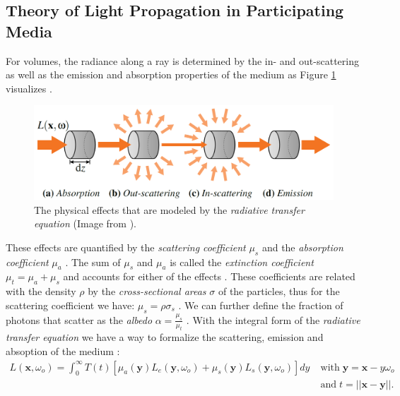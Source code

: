 \subsection{Theory of Light Propagation in Participating Media}
\label{subsec:theory_of_light_propagation_in_participating_media}
For volumes, the radiance along a ray is determined by the in- and out-scattering as well as the emission and absorption properties of the medium as Figure \ref{fig:novak_volume_effects} visualizes \cite{novak_overview}.
\begin{figure}[ht]
    \centering
    \includegraphics[width=0.7\linewidth]{img/novak_volume_effects.png}
    \caption[Physical effects in a volume]{The physical effects that are modeled by the \textit{radiative transfer equation} (Image from \cite{novak_overview}).}
    \label{fig:novak_volume_effects}
\end{figure}
These effects are quantified by the \textit{scattering coefficient} $\mu_s$ and the \textit{absorption coefficient} $\mu_a$ \cite{novak_overview}.
The sum of $\mu_s$ and $\mu_a$ is called the \textit{extinction coefficient} $\mu_t=\mu_a + \mu_s$ and accounts for either of the effects \cite{novak_overview}.
These coefficients are related with the density $\rho$ by the \textit{cross-sectional areas} $\sigma$ of the particles, thus for the scattering coefficient we have: $\mu_s = \rho \sigma_s$ \cite{novak_overview}.
We can further define the fraction of photons that scatter as the \textit{albedo} $\alpha=\frac{\mu_s}{\mu_t}$ \cite{novak_overview}.
With the integral form of the \textit{radiative transfer equation} we have a way to formalize the scattering, emission and absoption of the medium \cite{novak_overview}:
\begin{equation}
    \begin{split}
        \label{eq:radiative_transfer}
        L(\boldsymbol{x}, \omega_o) = \int_0^\infty T(t)[\mu_a(\boldsymbol{y})L_e(\boldsymbol{y}, \omega_o) + \mu_s(\boldsymbol{y})L_s(\boldsymbol{y}, \omega_o)]dy & \;\text{with}\; \boldsymbol{y}=\boldsymbol{x} - y\omega_o \\
                                                                                                                                                                    & \;\text{and}\; t=||\boldsymbol{x}-\boldsymbol{y}||.
    \end{split}
\end{equation}
